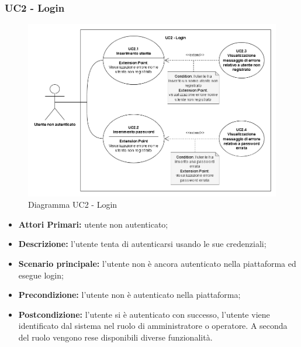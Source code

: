 \subsubsection{UC2 - Login}

\begin{figure}[h!]
	\includegraphics[width=17cm]{images/UC2.png}
	\caption{Diagramma UC2 - Login}
\end{figure}

\begin{itemize}
	\item \textbf{Attori Primari:} utente non autenticato;
	\item \textbf{Descrizione:} l'utente tenta di autenticarsi usando le sue credenziali;
	\item \textbf{Scenario principale:} l'utente non è ancora autenticato nella piattaforma ed esegue login;
	\item \textbf{Precondizione:} l'utente non è autenticato nella piattaforma;
	\item \textbf{Postcondizione:} l'utente si è autenticato con successo, l'utente viene identificato dal sistema nel ruolo di amministratore o operatore. A seconda del ruolo vengono rese disponibili diverse funzionalità.
\end{itemize}

